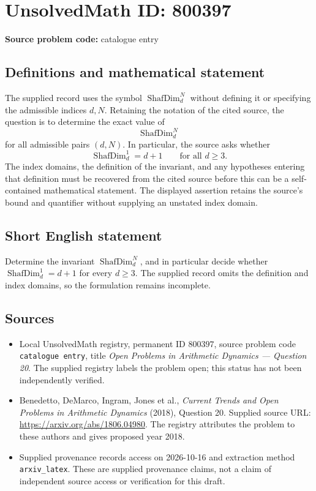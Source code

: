 \documentclass[11pt]{article}
\begin{document}
\section*{UnsolvedMath ID: 800397}
\textbf{Source problem code:} catalogue entry
\subsection{Definitions and mathematical statement}
The supplied record uses the symbol \(\operatorname{ShafDim}_d^N\) without defining it or specifying the admissible indices \(d,N\). Retaining the notation of the cited source, the question is to determine the exact value of
\[
\operatorname{ShafDim}_d^N
\]
for all admissible pairs \((d,N)\). In particular, the source asks whether
\[
\operatorname{ShafDim}_d^1=d+1\qquad\text{for all }d\geq 3.
\]
The index domains, the definition of the invariant, and any hypotheses entering that definition must be recovered from the cited source before this can be a self-contained mathematical statement. The displayed assertion retains the source's bound and quantifier without supplying an unstated index domain.
\subsection{Short English statement}
Determine the invariant \(\operatorname{ShafDim}_d^N\), and in particular decide whether \(\operatorname{ShafDim}_d^1=d+1\) for every \(d\geq3\). The supplied record omits the definition and index domains, so the formulation remains incomplete.
\subsection{Sources}
\begin{itemize}
\item Local UnsolvedMath registry, permanent ID \(800397\), source problem code \texttt{catalogue entry}, title \emph{Open Problems in Arithmetic Dynamics --- Question 20}. The supplied registry labels the problem open; this status has not been independently verified.
\item Benedetto, DeMarco, Ingram, Jones et al., \emph{Current Trends and Open Problems in Arithmetic Dynamics} (2018), Question 20. Supplied source URL: \url{https://arxiv.org/abs/1806.04980}. The registry attributes the problem to these authors and gives proposed year 2018.
\item Supplied provenance records access on 2026-10-16 and extraction method \texttt{arxiv\_latex}. These are supplied provenance claims, not a claim of independent source access or verification for this draft.
\end{itemize}
\end{document}
